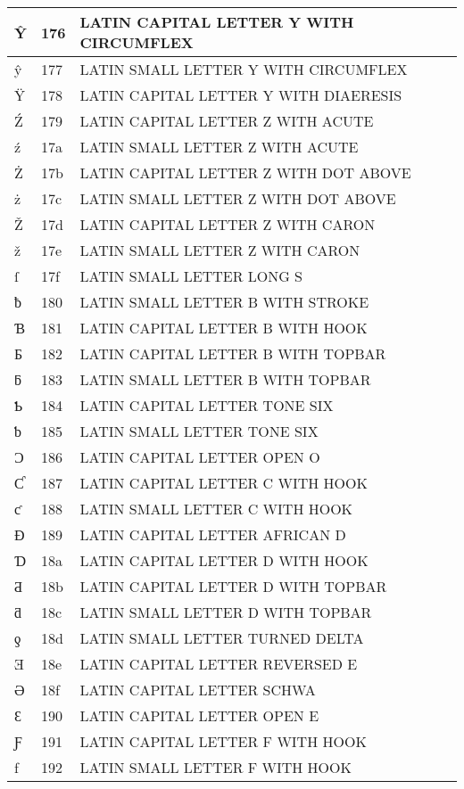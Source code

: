 \documentclass[12pt,letterpaper,openany]{book}
\begin{document}
\begin{center}
\begin{supertabular}{|m{0.25in}|m{0.5in}|m{4in}|}
Ŷ & 176 & LATIN CAPITAL LETTER Y WITH CIRCUMFLEX\\\hline
ŷ & 177 & LATIN SMALL LETTER Y WITH CIRCUMFLEX\\\hline
Ÿ & 178 & LATIN CAPITAL LETTER Y WITH DIAERESIS\\\hline
Ź & 179 & LATIN CAPITAL LETTER Z WITH ACUTE\\\hline
ź & 17a & LATIN SMALL LETTER Z WITH ACUTE\\\hline
Ż & 17b & LATIN CAPITAL LETTER Z WITH DOT ABOVE\\\hline
ż & 17c & LATIN SMALL LETTER Z WITH DOT ABOVE\\\hline
Ž & 17d & LATIN CAPITAL LETTER Z WITH CARON\\\hline
ž & 17e & LATIN SMALL LETTER Z WITH CARON\\\hline
ſ & 17f & LATIN SMALL LETTER LONG S\\\hline
ƀ & 180 & LATIN SMALL LETTER B WITH STROKE\\\hline
Ɓ & 181 & LATIN CAPITAL LETTER B WITH HOOK\\\hline
Ƃ & 182 & LATIN CAPITAL LETTER B WITH TOPBAR\\\hline
ƃ & 183 & LATIN SMALL LETTER B WITH TOPBAR\\\hline
Ƅ & 184 & LATIN CAPITAL LETTER TONE SIX\\\hline
ƅ & 185 & LATIN SMALL LETTER TONE SIX\\\hline
Ɔ & 186 & LATIN CAPITAL LETTER OPEN O\\\hline
Ƈ & 187 & LATIN CAPITAL LETTER C WITH HOOK\\\hline
ƈ & 188 & LATIN SMALL LETTER C WITH HOOK\\\hline
Ɖ & 189 & LATIN CAPITAL LETTER AFRICAN D\\\hline
Ɗ & 18a & LATIN CAPITAL LETTER D WITH HOOK\\\hline
Ƌ & 18b & LATIN CAPITAL LETTER D WITH TOPBAR\\\hline
ƌ & 18c & LATIN SMALL LETTER D WITH TOPBAR\\\hline
ƍ & 18d & LATIN SMALL LETTER TURNED DELTA\\\hline
Ǝ & 18e & LATIN CAPITAL LETTER REVERSED E\\\hline
Ə & 18f & LATIN CAPITAL LETTER SCHWA\\\hline
Ɛ & 190 & LATIN CAPITAL LETTER OPEN E\\\hline
Ƒ & 191 & LATIN CAPITAL LETTER F WITH HOOK\\\hline
ƒ & 192 & LATIN SMALL LETTER F WITH HOOK\\\hline

\end{supertabular}
\end{center}
\end{document}
